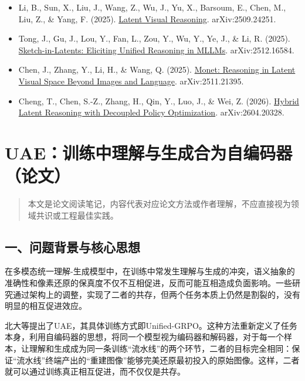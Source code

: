 \begin{itemize}
\tightlist
\item
  Li, B., Sun, X., Liu, J., Wang, Z., Wu, J., Yu, X., Barsoum, E., Chen, M., Liu, Z., \& Yang, F. (2025). \href{https://arxiv.org/abs/2509.24251}{Latent Visual Reasoning}. arXiv:2509.24251.
\item
  Tong, J., Gu, J., Lou, Y., Fan, L., Zou, Y., Wu, Y., Ye, J., \& Li, R. (2025). \href{https://arxiv.org/abs/2512.16584}{Sketch-in-Latents: Eliciting Unified Reasoning in MLLMs}. arXiv:2512.16584.
\item
  Chen, J., Zhang, Y., Li, H., \& Wang, Q. (2025). \href{https://arxiv.org/abs/2511.21395}{Monet: Reasoning in Latent Visual Space Beyond Images and Language}. arXiv:2511.21395.
\item
  Cheng, T., Chen, S.-Z., Zhang, H., Qin, Y., Luo, J., \& Wei, Z. (2026). \href{https://arxiv.org/abs/2604.20328}{Hybrid Latent Reasoning with Decoupled Policy Optimization}. arXiv:2604.20328.
\end{itemize}

\clearpage

\hypertarget{uaeux8badux7ec3ux4e2dux7406ux89e3ux4e0eux751fux6210ux5408ux4e3aux81eaux7f16ux7801ux5668ux8bbaux6587}{%
\section{UAE：训练中理解与生成合为自编码器（论文）}\label{uaeux8badux7ec3ux4e2dux7406ux89e3ux4e0eux751fux6210ux5408ux4e3aux81eaux7f16ux7801ux5668ux8bbaux6587}}

\begin{quote}
本文是论文阅读笔记，内容代表对应论文方法或作者理解，不应直接视为领域共识或工程最佳实践。
\end{quote}

\hypertarget{ux4e00ux95eeux9898ux80ccux666fux4e0eux6838ux5fc3ux601dux60f3-2}{%
\subsection{一、问题背景与核心思想}\label{ux4e00ux95eeux9898ux80ccux666fux4e0eux6838ux5fc3ux601dux60f3-2}}

在多模态统一理解-生成模型中，在训练中常发生理解与生成的冲突，语义抽象的准确性和像素还原的保真度不仅不互相促进，反而可能互相造成负面影响。一些研究通过架构上的调整，实现了二者的共存，但两个任务本质上仍然是割裂的，没有明显的相互促进效应。

北大等提出了UAE，其具体训练方式即Unified-GRPO。这种方法重新定义了任务本身，利用自编码器的思想，将同一个模型视为编码器和解码器，对于每一个样本，让理解和生成成为同一条训练``流水线''的两个环节，二者的目标完全相同：保证``流水线''终端产出的``重建图像''能够完美还原最初投入的原始图像。这样，二者就可以通过训练真正相互促进，而不仅仅是共存。

